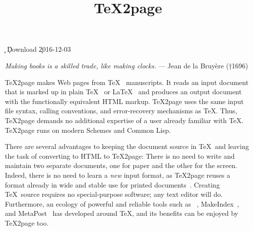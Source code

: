 %




\ifx\TZPtitle\UnDeFiNeD
\def\TZPtitle{TeX2page}\fi

\title{\TeX2page}

\smallskip

\c{}
%
\ifx\inpltdist\Undefined
\ifx\shipout\UnDeFiNeD
\c{Download
}
\else
\c{2016-12-03} %
\fi
\fi
%


\ifx\shipout\UnDeFiNeD
\centerline{}
\fi

{\obeylines\raggedleft
\ifx\shipout\UnDeFiNeD\small\else\eightfont\fi
{\it Making books is a skilled trade,
like making clocks.}
— Jean de la Bruyère (†1696)
}


\medskip


\n
\TeX2page
makes Web pages
from \TeX~\cite{tex} manuscripts.
It reads an
input document that is marked up in
plain \TeX~\cite{clark:tex} or \LaTeX~\cite{latex}
and
produces an output document with the functionally
equivalent HTML markup.
\TeX2page uses the same input
file syntax, calling conventions, and  error-recovery
mechanisms as \TeX.  Thus, \TeX2page demands no additional
expertise of a user already familiar with \TeX.
\TeX2page runs on modern Schemes and Common Lisp.

There are several advantages to keeping the document
source in \TeX\ and leaving the task of converting to
HTML to \TeX2page:  There is no need to write and
maintain two separate documents, one for paper and the
other for the screen.  Indeed, there is no need to
learn a {\em new} input format, as \TeX2page reuses a
format already in wide and stable use for printed
documents~\cite{tug,ctan}.  Creating \TeX\
source requires no special-purpose software; any text
editor will do.  Furthermore, an ecology of powerful and
reliable tools such as \BibTeX~\cite{bibtex},
MakeIndex~\cite{makeindex}, and
MetaPost~\cite{metapost} has developed around \TeX, and
its benefits can be enjoyed by \TeX2page too.

